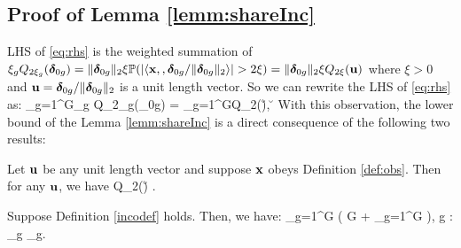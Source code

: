 	
		






%

\subsection{Proof of Lemma \ref{lemm:shareInc}}
\begin{IEEEproof}
	LHS of \eqref{eq:rhs} is the weighted summation of $\xi_g Q_{2\xi_g}(\boldsymbol{\delta}_{0g}) = \|\boldsymbol{\delta}_{0g}\|_{2}\xi \mathbb{P}(|\langle \mathbf{x}, , \boldsymbol{\delta}_{0g}/\|\boldsymbol{\delta}_{0g}\|_{2} \rangle| > 2\xi) = \|\boldsymbol{\delta}_{0g}\|_{2}\xi Q_{2\xi}(\mathbf{u})$ where $\xi > 0$ and $\mathbf{u} = \boldsymbol{\delta}_{0g}/\|\boldsymbol{\delta}_{0g}\|_{2}$ is a unit length vector. 
	So we can rewrite the LHS of \eqref{eq:rhs} as:
	\be 
	\nr 
	\sum_{g=1}^G\xi_g Q_{2\xi_g}(\ddelta_{0g}) = \sum_{g=1}^G\xi Q_{2\xi}(\u), \quad \u \in \sphere
	\ee 
	With this observation, the lower bound of the Lemma \ref{lemm:shareInc} is a direct consequence of the following two results: 
	\begin{lemma}\label{paley} Let $\mathbf{u}$ be any unit length vector and suppose $\mathbf{x}$ obeys Definition \ref{def:obs}. Then for any $\mathbf{u}$, we have
		\be 
		Q_{2\xi}(\u) \geq {}.
		\ee 	
	\end{lemma}
	\begin{lemma} \label{incolem main} Suppose Definition \ref{incodef} holds. Then, we have: 
		\be 
		\sum_{g=1}^G  \geq{} \left( G + \sum_{g=1}^G   \right), \quad \forall g \in [G_+]: \ddelta_g \in \cC_g.
		\ee 
	\end{lemma}	
\end{IEEEproof}



